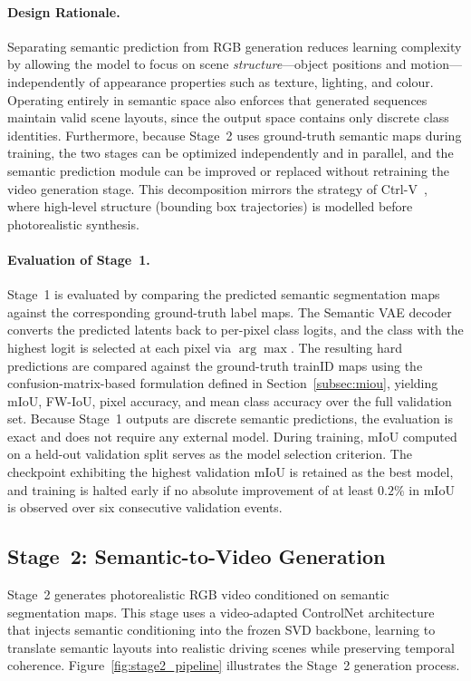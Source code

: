 \paragraph{Design Rationale.}
Separating semantic prediction from RGB generation reduces learning complexity by allowing the model to focus on scene \emph{structure}---object positions and motion---independently of appearance properties such as texture, lighting, and colour. Operating entirely in semantic space also enforces that generated sequences maintain valid scene layouts, since the output space contains only discrete class identities. Furthermore, because Stage~2 uses ground-truth semantic maps during training, the two stages can be optimized independently and in parallel, and the semantic prediction module can be improved or replaced without retraining the video generation stage. This decomposition mirrors the strategy of Ctrl-V~\cite{luo2025ctrlv}, where high-level structure (bounding box trajectories) is modelled before photorealistic synthesis.

\paragraph{Evaluation of Stage~1.}
Stage~1 is evaluated by comparing the predicted semantic segmentation maps against the corresponding ground-truth label maps. The Semantic VAE decoder converts the predicted latents back to per-pixel class logits, and the class with the highest logit is selected at each pixel via $\arg\max$. The resulting hard predictions are compared against the ground-truth trainID maps using the confusion-matrix-based formulation defined in Section~\ref{subsec:miou}, yielding mIoU, FW-IoU, pixel accuracy, and mean class accuracy over the full validation set. Because Stage~1 outputs are discrete semantic predictions, the evaluation is exact and does not require any external model. During training, mIoU computed on a held-out validation split serves as the model selection criterion. The checkpoint exhibiting the highest validation mIoU is retained as the best model, and training is halted early if no absolute improvement of at least $0.2\%$ in mIoU is observed over six consecutive validation events.

\subsection{Stage~2: Semantic-to-Video Generation}
\label{subsec:stage2}

Stage~2 generates photorealistic RGB video conditioned on semantic segmentation maps. This stage uses a video-adapted ControlNet architecture~\cite{zhang2023adding} that injects semantic conditioning into the frozen SVD backbone, learning to translate semantic layouts into realistic driving scenes while preserving temporal coherence. Figure~\ref{fig:stage2_pipeline} illustrates the Stage~2 generation process.

